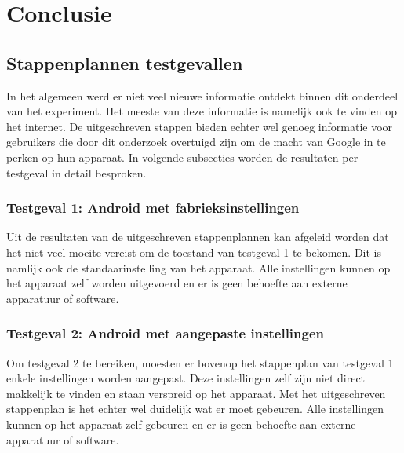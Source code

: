 
\chapter{Conclusie}
\label{ch:conclusie}


\section{Stappenplannen testgevallen}
In het algemeen werd er niet veel nieuwe informatie ontdekt binnen dit onderdeel van het experiment. Het meeste van deze informatie is namelijk ook te vinden op het internet. De uitgeschreven stappen bieden echter wel genoeg informatie voor gebruikers die door dit onderzoek overtuigd zijn om de macht van Google in te perken op hun apparaat. In volgende subsecties worden de resultaten per testgeval in detail besproken.


\subsection{Testgeval 1: Android met fabrieksinstellingen}
Uit de resultaten van de uitgeschreven stappenplannen kan afgeleid worden dat het niet veel moeite vereist om de toestand van testgeval 1 te bekomen. Dit is namlijk ook de standaarinstelling van het apparaat. Alle instellingen kunnen op het apparaat zelf worden uitgevoerd en er is geen behoefte aan externe apparatuur of software.

\subsection{Testgeval 2: Android met aangepaste instellingen}
Om testgeval 2 te bereiken, moesten er bovenop het stappenplan van testgeval 1 enkele instellingen worden aangepast. Deze instellingen zelf zijn niet direct makkelijk te vinden en staan verspreid op het apparaat. Met het uitgeschreven stappenplan is het echter wel duidelijk wat er moet gebeuren. Alle instellingen kunnen op het apparaat zelf gebeuren en er is geen behoefte aan externe apparatuur of software.

